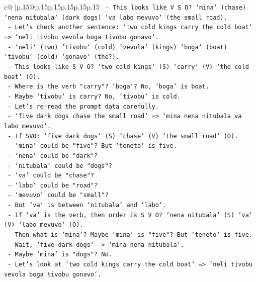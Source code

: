 \documentclass{article}
\begin{document}
{\begin{supertabular}{c@{$\;$}|p{.15\linewidth}@{}p{.15\linewidth}p{.15\linewidth}p{.15\linewidth}p{.15\linewidth}p{.15\linewidth}}
{{{\texttt{       {-} This looks like V S O? `mina` (chase) `nena nitubala` (dark dogs) `va labo mevuvo` (the small road).} \\
\texttt{       {-} Let's check another sentence: `two cold kings carry the cold boat` => `neli tivobu vevola boga tivobu gonavo`.} \\
\texttt{         {-} `neli` (two) `tivobu` (cold) `vevola` (kings) `boga` (boat) `tivobu` (cold) `gonavo` (the?).} \\
\texttt{         {-} This looks like S V O? `two cold kings` (S) `carry` (V) `the cold boat` (O).} \\
\texttt{         {-} Where is the verb "carry"? `boga`? No, `boga` is boat.} \\
\texttt{         {-} Maybe `tivobu` is carry? No, `tivobu` is cold.} \\
\texttt{         {-} Let's re{-}read the prompt data carefully.} \\
\texttt{         {-} `five dark dogs chase the small road` => `mina nena nitubala va labo mevuvo`.} \\
\texttt{           {-} If SVO: `five dark dogs` (S) `chase` (V) `the small road` (O).} \\
\texttt{           {-} `mina` could be "five"? But `teneto` is five.} \\
\texttt{           {-} `nena` could be "dark"?} \\
\texttt{           {-} `nitubala` could be "dogs"?} \\
\texttt{           {-} `va` could be "chase"?} \\
\texttt{           {-} `labo` could be "road"?} \\
\texttt{           {-} `mevuvo` could be "small"?} \\
\texttt{           {-} But `va` is between `nitubala` and `labo`.} \\
\texttt{           {-} If `va` is the verb, then order is S V O? `nena nitubala` (S) `va` (V) `labo mevuvo` (O).} \\
\texttt{           {-} Then what is `mina`? Maybe `mina` is "five"? But `teneto` is five.} \\
\texttt{           {-} Wait, `five dark dogs` {-}> `mina nena nitubala`.} \\
\texttt{           {-} Maybe `mina` is "dogs"? No.} \\
\texttt{           {-} Let's look at `two cold kings carry the cold boat` => `neli tivobu vevola boga tivobu gonavo`.} \\
}}}
\end{supertabular}}
\end{document}
